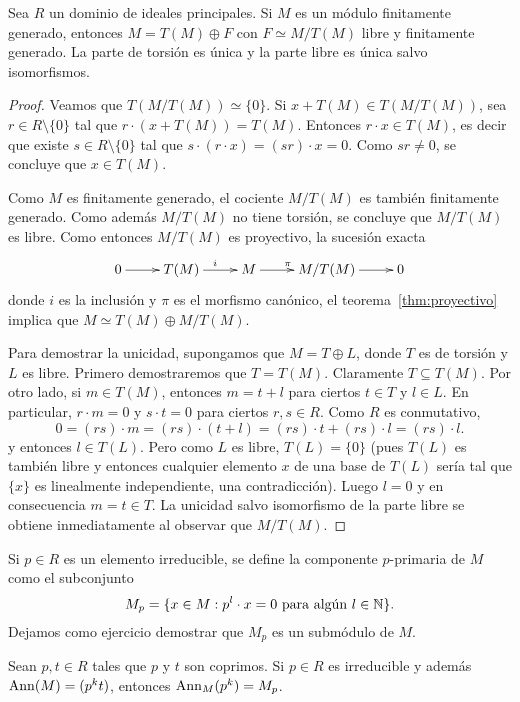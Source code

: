\begin{theorem}
Sea $R$ un dominio de ideales principales. 
Si $M$ es un módulo finitamente generado, entonces $M=T(M)\oplus F$ con $F\simeq M/T(M)$ libre y finitamente generado. La
parte de torsión es única y la parte libre es única salvo isomorfismos.
\end{theorem}

\begin{proof}
	Veamos que $T(M/T(M))\simeq\{0\}$. Si $x+T(M)\in T(M/T(M))$, sea $r\in R\setminus\{0\}$ tal que
	$r\cdot (x+T(M))=T(M)$. Entonces $r\cdot x\in T(M)$, es decir que existe $s\in R\setminus\{0\}$ tal que $s\cdot (r\cdot x)=(sr)\cdot x=0$. 
	Como $sr\ne 0$, se concluye que $x\in T(M)$. 
	
	Como $M$ es finitamente generado, el cociente $M/T(M)$ es también finitamente generado. Como además $M/T(M)$ no tiene torsión, 
	se concluye que $M/T(M)$ es libre. 
	Como entonces $M/T(M)$ es proyectivo, la sucesión exacta 
	\[
	\xymatrix{
	 0\ar[r] 
	 & T(M)
	 \ar[r]^i
	 & M
	 \ar[r]^{\pi}
	 & M/T(M)
	 \ar[r]
	 & 0
	 }
	 \]
	 donde $i$ es la inclusión y $\pi$ es el morfismo canónico, 	el teorema~\ref{thm:proyectivo} 
	 implica que $M\simeq T(M)\oplus M/T(M)$. 	
	 
	 Para demostrar la unicidad, supongamos que $M=T\oplus L$, donde $T$ es de torsión y $L$ es libre. Primero
	 demostraremos que $T=T(M)$. Claramente 
	 $T\subseteq T(M)$. Por otro lado, si $m\in T(M)$, entonces $m=t+l$ para ciertos $t\in T$ y $l\in L$. En particular, 
	 $r\cdot m=0$ y $s\cdot t=0$ para ciertos $r,s\in R$. Como $R$ es conmutativo, 
	 \[
	 0=(rs)\cdot m=(rs)\cdot (t+l)=(rs)\cdot t+(rs)\cdot l=(rs)\cdot l.
	 \]
	 y entonces $l\in T(L)$. Pero 
	 como $L$ es libre, $T(L)=\{0\}$ (pues $T(L)$ es también libre y entonces cualquier elemento $x$  
	 de una base de $T(L)$ sería tal que $\{x\}$ es linealmente independiente, una contradicción). Luego 
	 $l=0$ y en consecuencia $m=t\in T$. La unicidad salvo isomorfismo de la parte libre
	 se obtiene inmediatamente al observar que $M/T(M)$. 
\end{proof}


Si $p\in R$ es un elemento irreducible, se define la componente $p$-primaria de $M$ como
el subconjunto 
\[
M_p=\{x\in M:p^l\cdot x=0\text{ para algún $l\in\mathbb{N}$}\}.
\]
Dejamos como ejercicio demostrar que $M_p$ es un submódulo de $M$. 

\begin{lemma}
	\label{lem:Mp}
	Sean $p,t\in R$ tales que $p$ y $t$ son coprimos. Si $p\in R$ es irreducible y además   
	$\operatorname{Ann}(M)=(p^kt)$, entonces $\operatorname{Ann}_M(p^k)=M_p$. 
\end{lemma}

